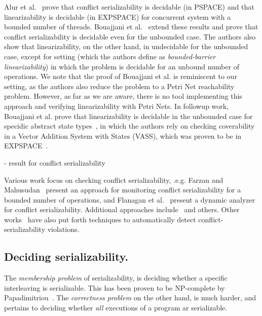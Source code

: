 Alur et al.~\cite{AlMcPe96} prove that conflict serializability is decidable (in PSPACE) and that linearizability is decidable (in EXPSPACE) for concurrent system with a bounded number of threads.
%
Bouajjani et al.~\cite{BoEmEnHa13} extend these results and prove that conflict serializability is decidable even for the unbounded case. The authors also show that linearizability, on the other hand, in undecidable for the unbounded case, except for setting (which the authors define as \textit{bounded-barrier linearizability}) in which the problem is decidable for an unbound number of operations.
%
We note that the proof of Bouajjani et al. is reminiscent to our setting, as the authors also reduce the problem to a Petri Net reachability problem.
%
However, as far as we are aware, there is no tool implementing this approach and verifying linearizability with Petri Nets.
%
In followup work, Bouajjani et al. prove that linearizability is decidable in the unbounded case for specidic abstract state types~\cite{BoEmEnHa18}, in which the authors rely on checking coverability in a Vector Addition System with States (VASS), which was proven to be in EXPSPACE~\cite{Ra78}.

- result for conflict serializability

Various work focus on checking conflict serializability, .e.g. Farzan and Mahusudan~\cite{FaMa08} present an approach for monitoring conflict serializability for a bounded number of operations, and Flanagan et al.~\cite{FlFrYi08} present a dynamic analyzer for conflict serializability. Additional approaches include~\cite{CoOlPnTuZu07,EmMaMa10} and others.
%
Other works~\cite{XuBoRa05} have also put forth techniques to automatically detect conflict-serializability violations.




\subsection{Deciding serializability.}
\label{sec:related:deciding-serializability}


The \textit{membership problem} of serializability, is deciding whether a specific interleaving is serializable. This has been proven to be NP-complete by Papadimitriou~\cite{Pa79}.
%
The \textit{correctness problem} on the other hand, is much harder, and pertains to deciding whether \textit{all} executions of a program ar serializable.

